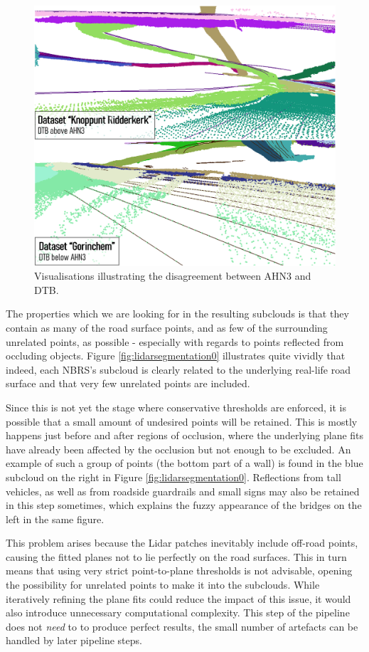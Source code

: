 \begin{figure}
    \centering
    \includegraphics[width=0.86\linewidth]{final_report/figs/lidarsegmentation1.png}
    \caption{Visualisations illustrating the disagreement between AHN3 and DTB.}
    \label{fig:lidarsegmentation1}
\end{figure}

The properties which we are looking for in the resulting subclouds is that they contain as many of the road surface points, and as few of the surrounding unrelated points, as possible - especially with regards to points reflected from occluding objects. Figure \ref{fig:lidarsegmentation0} illustrates quite vividly that indeed, each NBRS's subcloud is clearly related to the underlying real-life road surface and that very few unrelated points are included.

Since this is not yet the stage where conservative thresholds are enforced, it is possible that a small amount of undesired points will be retained. This is mostly happens just before and after regions of occlusion, where the underlying plane fits have already been affected by the occlusion but not enough to be excluded. An example of such a group of points (the bottom part of a wall) is found in the blue subcloud on the right in Figure \ref{fig:lidarsegmentation0}. Reflections from tall vehicles, as well as from roadside guardrails and small signs may also be retained in this step sometimes, which explains the fuzzy appearance of the bridges on the left in the same figure.

This problem arises because the Lidar patches inevitably include off-road points, causing the fitted planes not to lie perfectly on the road surfaces. This in turn means that using very strict point-to-plane thresholds is not advisable, opening the possibility for unrelated points to make it into the subclouds. While iteratively refining the plane fits could reduce the impact of this issue, it would also introduce unnecessary computational complexity. This step of the pipeline does not \textit{need} to to produce perfect results, the small number of artefacts can be handled by later pipeline steps. 

